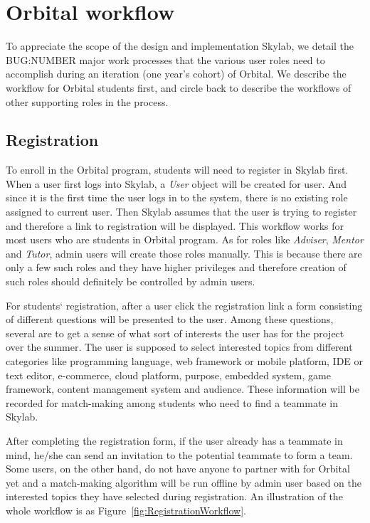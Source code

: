 \chapter{Orbital workflow} \label{workflow}

To appreciate the scope of the design and implementation Skylab, we detail the BUG:NUMBER major work processes that the various user roles need to accomplish during an iteration (one year's cohort) of Orbital.  We describe the workflow for Orbital students first, and circle back to describe the workflows of other supporting roles in the process.

\section{Registration} \label{registration}

To enroll in the Orbital program, students will need to register in Skylab first. When a user first logs into Skylab, a \textit{User} object will be created for user. And since it is the first time the user logs in to the system, there is no existing role assigned to current user. Then Skylab assumes that the user is trying to register and therefore a link to registration will be displayed. This workflow works for most users who are students in Orbital program. As for roles like \textit{Adviser}, \textit{Mentor} and \textit{Tutor}, admin users will create those roles manually. This is because there are only a few such roles and they have higher privileges and therefore creation of such roles should definitely be controlled by admin users.

For students` registration, after a user click the registration link a form consisting of different questions will be presented to the user. Among these questions, several are to get a sense of what sort of interests the user has for the project over the summer. The user is supposed to select interested topics from different categories like programming language, web framework or mobile platform, IDE or text editor, e-commerce, cloud platform, purpose, embedded system, game framework, content management system and audience. These information will be recorded for match-making among students who need to find a teammate in Skylab.

After completing the registration form, if the user already has a teammate in mind, he/she can send an invitation to the potential teammate to form a team. Some users, on the other hand, do not have anyone to partner with for Orbital yet and a match-making algorithm will be run offline by admin user based on the interested topics they have selected during registration. An illustration of the whole workflow is as Figure~\ref{fig:RegistrationWorkflow}.

